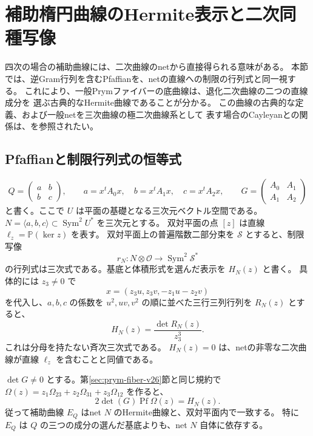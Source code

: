 \section{補助楕円曲線のHermite表示と二次同種写像}
\label{sec:hermite-net-v27}

四次の場合の補助曲線には、二次曲線のnetから直接得られる意味がある。
本節では、逆Gram行列を含むPfaffianを、netの直線への制限の行列式と同一視する。
これにより、一般Prymファイバーの底曲線は、退化二次曲線の二つの直線成分を
選ぶ古典的なHermite曲線であることが分かる。
この曲線の古典的な定義、および一般netを三次曲線の極二次曲線系として
表す場合のCayleyanとの関係は、\cite[著者公開原稿 \S3.2.2, Exercise 3.12]{DolgachevCAG}を参照されたい。

\subsection{Pfaffianと制限行列式の恒等式}

\[
 Q=\begin{pmatrix}a&b\\b&c\end{pmatrix},\qquad
 a=x^tA_0x,\quad b=x^tA_1x,\quad c=x^tA_2x,
 \qquad G=\begin{pmatrix}A_0&A_1\\A_1&A_2\end{pmatrix}
\]
と書く。ここで $U$ は平面の基礎となる三次元ベクトル空間である。
$N=\langle a,b,c\rangle\subset\operatorname{Sym}^2U^*$ を三次元とする。
双対平面の点 $[z]$ は直線 $\ell_z=\mathbb P(\ker z)$ を表す。
双対平面上の普遍階数二部分束を $\mathcal S$ とすると、制限写像
\[
 r_N:N\otimes\mathcal O\longrightarrow\operatorname{Sym}^2\mathcal S^*
\]
の行列式は三次式である。基底と体積形式を選んだ表示を $H_N(z)$ と書く。
具体的には $z_3\ne0$ で
\[
 x=(z_3u,z_3v,-z_1u-z_2v)
\]
を代入し、$a,b,c$ の係数を $u^2,uv,v^2$ の順に並べた三行三列行列を $R_N(z)$ とすると、
\[
 H_N(z)=\frac{\det R_N(z)}{z_3^3}.
\]
これは分母を持たない斉次三次式である。
$H_N(z)=0$ は、netの非零な二次曲線が直線 $\ell_z$ を含むことと同値である。

\begin{proposition}
\label{prop:hermite-pfaffian-v27}
$\det G\ne0$ とする。第\ref{sec:prym-fiber-v26}節と同じ規約で
$\Omega(z)=z_1\Omega_{23}+z_2\Omega_{31}+z_3\Omega_{12}$ を作ると、
\[
 \boxed{\quad 2\det(G)\operatorname{Pf}\Omega(z)=H_N(z).\quad}
\]
従って補助曲線 $E_Q$ はnet $N$ のHermite曲線と、双対平面内で一致する。
特に $E_Q$ は $Q$ の三つの成分の選んだ基底よりも、net $N$ 自体に依存する。
\end{proposition}

